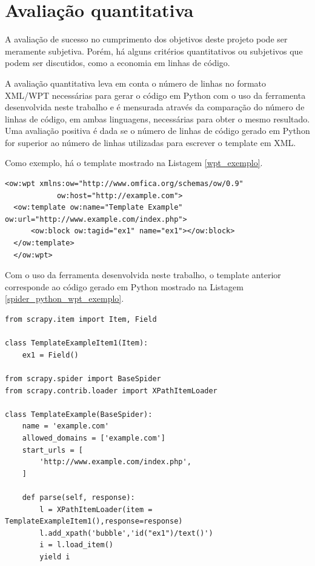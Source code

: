 \section{Avaliação quantitativa}

A avaliação de sucesso no cumprimento dos objetivos deste projeto pode ser meramente subjetiva. Porém, há alguns critérios quantitativos ou subjetivos que podem ser discutidos, como a economia em linhas de código. 

A avaliação quantitativa leva em conta o número de linhas no formato XML/WPT necessárias para gerar o código em Python com o uso da ferramenta desenvolvida neste trabalho e é mensurada através da comparação do número de linhas de código, em ambas linguagens, necessárias para obter o mesmo resultado. Uma avaliação positiva é dada se o número de linhas de código gerado em Python for superior ao número de linhas utilizadas para escrever o template em XML.

Como exemplo, há o template mostrado na Listagem \ref{wpt_exemplo}.

\begin{lstlisting}[label=wpt_exemplo]
  <ow:wpt xmlns:ow="http://www.omfica.org/schemas/ow/0.9"
            ow:host="http://example.com">
  <ow:template ow:name="Template Example" ow:url="http://www.example.com/index.php">
      <ow:block ow:tagid="ex1" name="ex1"></ow:block>
  </ow:template> 
  </ow:wpt>
\end{lstlisting}

Com o uso da ferramenta desenvolvida neste trabalho, o template anterior corresponde ao código gerado em Python mostrado na Listagem \ref{spider_python_wpt_exemplo}.

\begin{lstlisting}[label=spider_python_wpt_exemplo]
from scrapy.item import Item, Field

class TemplateExampleItem1(Item):
    ex1 = Field()

from scrapy.spider import BaseSpider
from scrapy.contrib.loader import XPathItemLoader

class TemplateExample(BaseSpider):
    name = 'example.com'
    allowed_domains = ['example.com']
    start_urls = [
        'http://www.example.com/index.php',
    ]
    
    def parse(self, response):
        l = XPathItemLoader(item = TemplateExampleItem1(),response=response)
        l.add_xpath('bubble','id("ex1")/text()') 
        i = l.load_item()
        yield i
\end{lstlisting}

